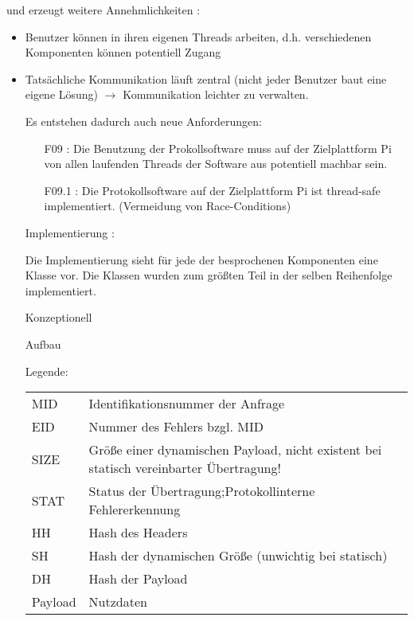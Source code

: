 und erzeugt weitere Annehmlichkeiten : 
\begin{itemize}
	\item Benutzer können in ihren eigenen Threads arbeiten, d.h. verschiedenen Komponenten können potentiell Zugang
	\item Tatsächliche Kommunikation läuft zentral (nicht jeder Benutzer baut eine eigene Lösung) $\rightarrow$ Kommunikation leichter zu verwalten. 

Es entstehen dadurch auch neue Anforderungen:
\begin{itemize}
	\item	[F09] : Die Benutzung der Prokollsoftware muss auf der Zielplattform Pi von allen laufenden Threads der Software aus potentiell machbar sein.
	\item	[F09.1] : Die Protokollsoftware auf der Zielplattform Pi ist thread-safe implementiert. (Vermeidung von Race-Conditions)
\end{itemize}

\Large Implementierung :

Die Implementierung sieht für jede der besprochenen Komponenten eine Klasse vor.
Die Klassen wurden zum größten Teil in der selben Reihenfolge implementiert.






\LARGE Konzeptionell

\Large Aufbau
\normalsize

\large 
Legende:\\
\normalsize
\begin{center}
\small
\begin{tabular}{l | l}
MID &	Identifikationsnummer der Anfrage\\
EID &	Nummer des Fehlers bzgl. MID\\
SIZE&	Größe einer dynamischen Payload, nicht existent bei statisch vereinbarter Übertragung!\\
STAT&	Status der Übertragung;Protokollinterne Fehlererkennung\\
HH	&	Hash des Headers\\
SH	&	Hash der dynamischen Größe (unwichtig bei statisch)\\
DH	&	Hash der Payload\\
Payload & Nutzdaten\\
\end{tabular}
\end{center}
\normalsize


\end{itemize}
